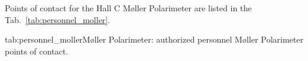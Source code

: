 {\begin{safetyen}{0}{0}
Points of contact for the Hall C M\o ller Polarimeter are listed in the Tab.~\ref{tab:personnel_moller}.

\begin{namestab}{tab:personnel_moller}{M\o ller Polarimeter: authorized personnel}{%
   M\o ller Polarimeter points of contact.}
\end{namestab}
\end{safetyen}
}
